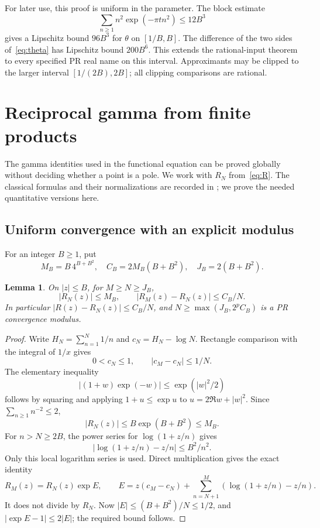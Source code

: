 \documentclass[11pt,letterpaper]{article}
\numberwithin{equation}{section}
\newtheorem{lemma}[theorem]{Lemma}
\theoremstyle{definition}
\newcommand{\gamrec}{R}
\begin{document}
For later use, this proof is uniform in the parameter.
The block estimate
\[
 \sum_{n\ge1}n^2\exp(-\pi tn^2)\le12B^3
\]
gives a Lipschitz bound \(96B^3\) for \(\theta\) on
\([1/B,B]\). The difference of the two sides
of~\eqref{eq:theta} has Lipschitz bound \(200B^6\).
This extends the rational-input theorem to every specified PR
real name on this interval. Approximants may be clipped to the
larger interval \([1/(2B),2B]\); all clipping comparisons are rational.

\section{Reciprocal gamma from finite products}\label{sec:gamma}

The gamma identities used in the functional equation can be proved
globally without deciding whether a point is a pole. We work with
\(\gamrec_N\) from~\eqref{eq:R}. The classical formulas and their
normalizations are recorded in \cite{DLMF5,DLMF58}; we prove the
needed quantitative versions here.

\subsection{Uniform convergence with an explicit modulus}

For an integer \(B\ge1\), put
\begin{equation}
 M_B=B\,4^{B+B^2},\quad
 C_B=2M_B(B+B^2),\quad
 J_B=2(B+B^2).                                            \label{eq:gammaConstants}
\end{equation}

\begin{lemma}\label{lem:Rconverges}
On \(|z|\le B\), for \(M\ge N\ge J_B\),
\begin{equation}
 |\gamrec_N(z)|\le M_B,\qquad
 |\gamrec_M(z)-\gamrec_N(z)|\le C_B/N.
 \label{eq:Rtail}
\end{equation}
In particular \(|\gamrec(z)-\gamrec_N(z)|\le C_B/N\), and
\(N\ge\max(J_B,2^pC_B)\) is a PR convergence modulus.
\end{lemma}

\begin{proof}
Write \(H_N=\sum_{n=1}^N1/n\) and \(c_N=H_N-\log N\).
Rectangle comparison with the integral of \(1/x\) gives
\[
 0<c_N\le1,\qquad |c_M-c_N|\le1/N.
\]
The elementary inequality
\[
 |(1+w)\exp(-w)|\le\exp(|w|^2/2)
\]
follows by squaring and applying \(1+u\le\exp u\) to
\(u=2\Re w+|w|^2\). Since \(\sum_{n\ge1}n^{-2}\le2\),
\[
 |\gamrec_N(z)|\le B\exp(B+B^2)\le M_B.
\]
For \(n>N\ge2B\), the power series for \(\log(1+z/n)\) gives
\[
 |\log(1+z/n)-z/n|\le B^2/n^2.
\]
Only this local logarithm series is used. Direct multiplication gives
the exact identity
\[
 \gamrec_M(z)=\gamrec_N(z)\exp E,\qquad
 E=z(c_M-c_N)+\sum_{n=N+1}^M(\log(1+z/n)-z/n).
\]
It does not divide by \(\gamrec_N\).
Now \(|E|\le(B+B^2)/N\le1/2\), and
\(|\exp E-1|\le2|E|\); the required bound follows.
\end{proof}
\end{document}
